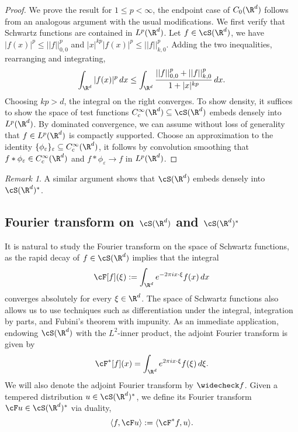 \documentclass[reqno]{amsart}
\theoremstyle{definition}
\theoremstyle{remark}
\newtheorem*{remark}{Remark}
\renewcommand{\epsilon}{\varepsilon}
\begin{document}
\begin{proof}
	We prove the result for $1 \leq p < \infty$, the endpoint case of $C_0 (\R^d)$ follows from an analogous argument with the usual modifications. We first verify that Schwartz functions are contained in $L^p (\R^d)$. Let $f \in \cS (\R^d)$, we have $|f(x)|^p \leq ||f||_{0, 0}^p$ and $|x|^{kp} |f(x)|^p \leq ||f||_{k, 0}^p$. Adding the two inequalities, rearranging and integrating, 
		\[ \int_{\R^d} |f(x)|^p \, dx \leq \int_{\R^d} \frac{||f||_{0, 0}^p + ||f||_{k, 0}^p}{1 + |x|^{kp}} \, dx . \]
	Choosing $kp > d$, the integral on the right converges. To show density, it suffices to show the space of test functions $C^\infty_c (\R^d) \subseteq \cS (\R^d)$ embeds densely into $L^p (\R^d)$. By dominated convergence, we can assume without loss of generality that $f \in L^p (\R^d)$ is compactly supported. Choose an approximation to the identity $\{\phi_\epsilon\}_\epsilon \subseteq C^\infty_c (\R^d)$, it follows by convolution smoothing that $f * \phi_\epsilon \in C^\infty_c (\R^d)$ and $f * \phi_\epsilon \to f$ in $L^p (\R^d)$.
\end{proof}

\begin{remark}
	A similar argument shows that $\cS (\R^d)$ embeds densely into $\cS (\R^d)^*$. 
\end{remark}

\subsection{Fourier transform on $\cS (\R^d)$ and $\cS (\R^d)^*$}

It is natural to study the Fourier transform	on the space of Schwartz functions, as the rapid decay of $f \in \cS(\R^d)$ implies that the integral
	\[ \cF [f] (\xi) := \int_{\R^d} e^{-2\pi i x \cdot \xi} f(x) \, dx \]	
converges absolutely for every $\xi \in \R^d$. The space of Schwartz functions also allows us to use techniques such as differentiation under the integral, integration by parts, and Fubini's theorem with impunity. As an immediate application, endowing $\cS (\R^d)$ with the $L^2$-inner product, the adjoint Fourier transform is given by 
	\[ \cF^* [f] (x) = \int_{\R^d} e^{2\pi i x \cdot \xi} f(\xi) \, d \xi. \]
We will also denote the adjoint Fourier transform by $\widecheck f$. Given a tempered distribution $u \in \cS(\R^d)^*$, we define its Fourier transform $\cF u \in \cS (\R^d)^*$ via duality, 
	\[ \langle f, \cF u \rangle := \langle \cF^* f, u \rangle.  \]
\end{document}
